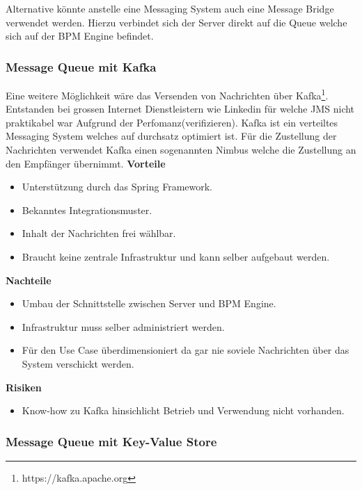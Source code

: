 Alternative könnte anstelle eine Messaging System auch eine Message Bridge verwendet werden. Hierzu verbindet sich der Server direkt auf die Queue welche sich auf der BPM Engine befindet.

\subsubsection{Message Queue mit Kafka}

Eine weitere Möglichkeit wäre das Versenden von Nachrichten über Kafka\footnote{https://kafka.apache.org}. Entstanden bei grossen Internet Dienstleistern wie Linkedin für welche JMS nicht praktikabel war Aufgrund der Perfomanz(verifizieren). Kafka ist ein verteiltes Messaging System welches auf durchsatz optimiert ist. Für die Zustellung der Nachrichten verwendet Kafka einen sogenannten Nimbus welche die Zustellung an den Empfänger übernimmt.
\newline
\newline
\textbf{Vorteile}
\begin{itemize}
	\item Unterstützung durch das Spring Framework.
	\item Bekanntes Integrationsmuster.
	\item Inhalt der Nachrichten frei wählbar.
	\item Braucht keine zentrale Infrastruktur und kann selber aufgebaut werden.
\end{itemize}
\textbf{Nachteile}
\begin{itemize}
	\item Umbau der Schnittstelle zwischen Server und BPM Engine.
	\item Infrastruktur muss selber administriert werden.
	\item Für den Use Case überdimensioniert da gar nie soviele Nachrichten über das System verschickt werden.
\end{itemize}
\textbf{Risiken}
\begin{itemize}
	\item Know-how zu Kafka hinsichlicht Betrieb und Verwendung nicht vorhanden.
\end{itemize}

\subsubsection{Message Queue mit Key-Value Store}

